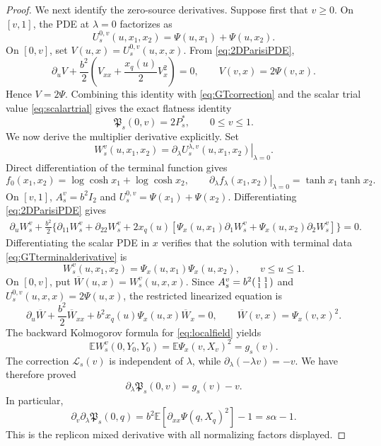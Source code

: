 \documentclass[11pt]{article}
\numberwithin{equation}{section}
\theoremstyle{plain}
\theoremstyle{definition}
\newcommand{\E}{\mathbb E}
\newcommand{\1}{\mathbf 1}
\begin{document}
\begin{proof}
We next identify the zero-source derivatives.  Suppose first that
$v\ge0$.  On $[v,1]$, the PDE at $\lambda=0$ factorizes as
\[
 U^{0,v}_s(u,x_1,x_2)=\Psi(u,x_1)+\Psi(u,x_2).
\]
On $[0,v]$, set $V(u,x)=U^{0,v}_s(u,x,x)$.  From
\eqref{eq:2DParisiPDE},
\[
 \partial_uV+\frac{b^2}{2}
 \left(V_{xx}+\frac{x_q(u)}2V_x^2\right)=0,
 \qquad V(v,x)=2\Psi(v,x).
\]
Hence $V=2\Psi$.  Combining this identity with
\eqref{eq:GTcorrection} and the scalar trial value
\eqref{eq:scalartrial} gives the exact flatness identity
\begin{equation}
 \mathfrak P_s(0,v)=2P_s^*,
 \qquad 0\le v\le1.
 \label{eq:GTflat}
\end{equation}
We now derive the multiplier derivative explicitly.  Set
\[
 W^{v}_s(u,x_1,x_2)
 =\left.\partial_\lambda
 U^{\lambda,v}_s(u,x_1,x_2)\right|_{\lambda=0}.
\]
Direct differentiation of the terminal function gives
\begin{equation}
 f_0(x_1,x_2)=\log\cosh x_1+\log\cosh x_2,\qquad
 \left.\partial_\lambda f_\lambda(x_1,x_2)\right|_{\lambda=0}
 =\tanh x_1\tanh x_2.
 \label{eq:GTterminalderivative}
\end{equation}
On $[v,1]$, $A_s^v=b^2I_2$ and
$U_s^{0,v}=\Psi(x_1)+\Psi(x_2)$.  Differentiating
\eqref{eq:2DParisiPDE} gives
\begin{align}
 \partial_uW_s^v+\frac{b^2}{2}\bigl\{
 \partial_{11}W_s^v+\partial_{22}W_s^v
 +2x_q(u)[\Psi_x(u,x_1)\partial_1W_s^v
          +\Psi_x(u,x_2)\partial_2W_s^v]\bigr\}=0.
 \label{eq:GTlinearizedupper}
\end{align}
Differentiating the scalar PDE in $x$ verifies that the solution with
terminal data \eqref{eq:GTterminalderivative} is
\begin{equation}
 W_s^v(u,x_1,x_2)
 =\Psi_x(u,x_1)\Psi_x(u,x_2),\qquad v\le u\le1.
 \label{eq:GTlinearizedproduct}
\end{equation}
On $[0,v]$, put $\overline W(u,x)=W_s^v(u,x,x)$.  Since
$A_s^v=b^2\begin{psmallmatrix}1&1\\1&1\end{psmallmatrix}$ and
$U_s^{0,v}(u,x,x)=2\Psi(u,x)$, the restricted linearized equation is
\begin{equation}
 \partial_u\overline W+\frac{b^2}{2}\overline W_{xx}
 +b^2x_q(u)\Psi_x(u,x)\overline W_x=0,\qquad
 \overline W(v,x)=\Psi_x(v,x)^2.
 \label{eq:GTlinearizedlower}
\end{equation}
The backward Kolmogorov formula for \eqref{eq:localfield} yields
\[
 \E W_s^v(0,Y_0,Y_0)=\E\Psi_x(v,X_v)^2=g_s(v).
\]
The correction $\mathcal L_s(v)$ is independent of $\lambda$, while
$\partial_\lambda(-\lambda v)=-v$.  We have therefore proved
\begin{equation}
 \partial_\lambda\mathfrak P_s(0,v)=g_s(v)-v.
 \label{eq:GTfirstderivative}
\end{equation}
In particular,
\begin{equation}
 \partial_v\partial_\lambda\mathfrak P_s(0,q)
 =b^2\E[\partial_{xx}\Psi(q,X_q)^2]-1
 =s\alpha-1.
 \label{eq:GTmixedderivative}
\end{equation}
This is the replicon mixed derivative with all normalizing factors
displayed.


\end{proof}
\end{document}

